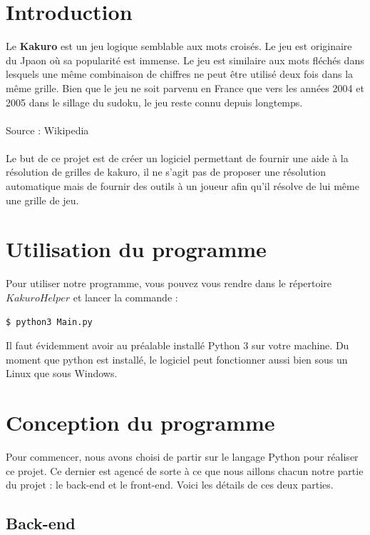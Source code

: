 \documentclass[12pt]{article}
\begin{document}
\tableofcontents
\newpage


\section{Introduction}
Le \textbf{Kakuro} est un jeu logique semblable aux mots croisés. Le jeu est originaire du Jpaon où sa popularité est immense. Le jeu est similaire aux mots fléchés dans lesquels une même combinaison de chiffres ne peut être utilisé deux fois dans la même grille. Bien que le jeu ne soit parvenu en France que vers les années 2004 et 2005 dans le sillage du sudoku, le jeu reste connu depuis longtemps. \\ \\ Source : Wikipedia \\ \\
Le but de ce projet est de créer un logiciel permettant de fournir une aide à la résolution de grilles de kakuro, il ne s'agit pas de proposer une résolution automatique mais de fournir des outils à un joueur afin qu'il résolve de lui même une grille de jeu.
\section{Utilisation du programme}
Pour utiliser notre programme, vous pouvez vous rendre dans le répertoire $Kakuro Helper$ et lancer la commande :
\begin{lstlisting}[language=bash]
  $ python3 Main.py
\end{lstlisting}
Il faut évidemment avoir au préalable installé Python 3 sur votre machine. Du moment que python est installé, le logiciel peut fonctionner aussi bien sous un Linux que sous Windows.

\newpage
\section{Conception du programme}
Pour commencer, nous avons choisi de partir sur le langage Python pour réaliser ce projet.
Ce dernier est agencé de sorte à ce que nous aillons chacun notre partie du projet : le back-end et le front-end. Voici les détails de ces deux parties.
\subsection{Back-end}
\end{document}
